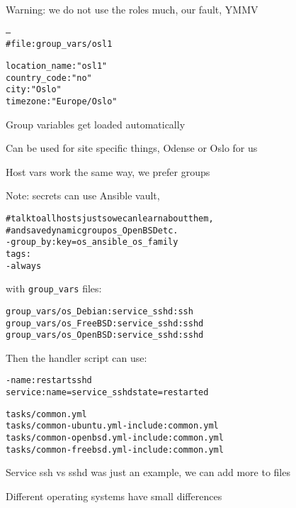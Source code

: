 \documentclass[18pt,landscape,a4paper,footrule]{foils}
\begin{document}
Warning: we do not use the roles much, our fault, YMMV




\begin{alltt}
---
# file: group_vars/osl1

location_name : "osl1"
country_code : "no"
city : "Oslo"
timezone : "Europe/Oslo"
\end{alltt}

\begin{list2}
\item Group variables get loaded automatically
\item Can be used for site specific things, Odense or Oslo for us
\item Host vars work the same way, we prefer groups
\item Note: secrets can use Ansible vault, 
\end{list2}



\begin{alltt}
  # talk to all hosts just so we can learn about them,
  # and save dynamic group os_OpenBSD etc.
  - group_by: key=os_{{ ansible_os_family }}
    tags:
        - always
\end{alltt}

with \verb+group_vars+ files:
\begin{alltt}
group_vars/os_Debian:service_sshd: ssh
group_vars/os_FreeBSD:service_sshd: sshd
group_vars/os_OpenBSD:service_sshd: sshd
\end{alltt}

Then the handler script can use:
\begin{alltt}
  - name: restart sshd
    service: name={{ service_sshd }} state=restarted
\end{alltt}




\begin{alltt}
tasks/common.yml
tasks/common-ubuntu.yml - include: common.yml
tasks/common-openbsd.yml - include: common.yml
tasks/common-freebsd.yml - include: common.yml
\end{alltt}

\begin{list2}
\item Service ssh vs sshd was just an example, we can add more to files
\item Different operating systems have small differences
\end{list2}
\end{document}
